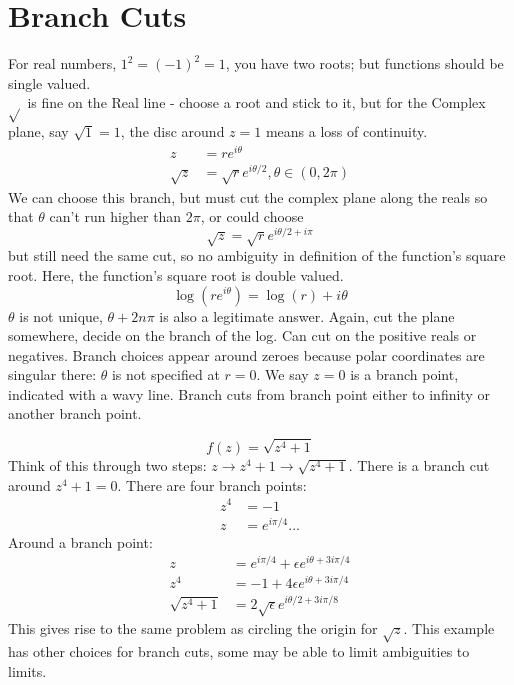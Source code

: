 \documentclass[a4paper, 11pt, normalem]{report}
\begin{document}
\section{Branch Cuts}
For real numbers, $1^2 = (-1)^2 = 1$, you have two roots; but functions should be single valued. \\
$\sqrt{}$ is fine on the Real line - choose a root and stick to it, but for the Complex plane, say $\sqrt{1} = 1$, the disc around $z = 1$ means a loss of continuity.
\begin{align}
    z &= re^{i\theta} \\
    \sqrt{z} &= \sqrt{r}e^{i\theta/2}, \theta \in (0, 2\pi)
\end{align}
We can choose this branch, but must cut the complex plane along the reals so that $\theta$ can't run higher than $2\pi$, or could choose
\begin{equation}
    \sqrt{z} = \sqrt{r}e^{i\theta/2 +i\pi}
\end{equation}
but still need the same cut, so no ambiguity in definition of the function's square root.
Here, the function's square root is double valued.
\begin{equation}
    \log(re^{i\theta}) = \log(r) + i\theta
\end{equation}
$\theta$ is not unique, $\theta + 2n\pi$ is also a legitimate answer.
Again, cut the plane somewhere, decide on the branch of the log.
Can cut on the positive reals or negatives.
Branch choices appear around zeroes because polar coordinates are singular there: $\theta$ is not specified at $r = 0$.
We say $z=0$ is a branch point, indicated with a wavy line.
Branch cuts from branch point either to infinity or another branch point.

\begin{example}
\begin{equation}
    f(z) = \sqrt{z^4 + 1}
\end{equation}
Think of this through two steps: $z \to z^4 + 1 \to \sqrt{z^4 + 1}$.
There is a branch cut around $z^4 + 1 = 0$.
There are four branch points:
\begin{align}
    z^4 &= -1 \\
    z &= e^{i\pi/4}...
\end{align}
Around a branch point:
\begin{align}
    z &= e^{i\pi/4} + \epsilon e^{i\theta + 3i\pi/4} \\
    z^4 &= -1 + 4\epsilon e^{i\theta +3i\pi/4} \\
    \sqrt{z^4 + 1} &= 2\sqrt{\epsilon}e^{i\theta/2 + 3i\pi/8}
\end{align}
This gives rise to the same problem as circling the origin for $\sqrt{z}$.
This example has other choices for branch cuts, some may be able to limit ambiguities to limits.
\end{example}
\end{document}
